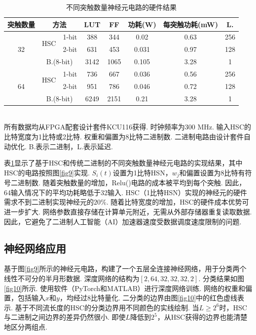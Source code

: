 \documentclass{solitairemiya-art}
\begin{document}
\begin{table}[htbp]
\centering
\caption{不同突触数量神经元电路的硬件结果}
\label{tab1}
\begin{tabular}{cccccccc}
\toprule
突触数量 & \multicolumn{2}{c}{方法} & LUT & FF & 功耗(W) & 每突触功耗(mW) & L. \\
\midrule
\multirow{3}{*}{32} & \multirow{2}{*}{HSC} & 1-bit & 388 & 344 & 0.02 & 0.63 & 256 \\
 & & 2-bit & 631 & 453 & 0.031 & 0.97 & 128 \\
 & \multicolumn{2}{c}{B.(8-bit)} & 3142 & 1065 & 0.105 & 3.28 & 1 \\
\midrule
\multirow{3}{*}{64} & \multirow{2}{*}{HSC} & 1-bit & 736 & 667 & 0.036 & 0.56 & 256 \\
 & & 2-bit & 951 & 786 & 0.046 & 0.72 & 128 \\
 & \multicolumn{2}{c}{B.(8-bit)} & 6249 & 2151 & 0.21 & 3.28 & 1 \\
\bottomrule
\end{tabular}
\\[0.5em]
\small
所有数据均从FPGA配套设计套件KCU116获得. 时钟频率为300 MHz. 输入HSC的比特宽度为1比特或2比特. 权重和偏置为8比特二进制数. 二进制电路由设计套件自动优化. B.表示二进制，L.表示延迟. 
\end{table}

表\ref{tab1}显示了基于HSC和传统二进制的不同突触数量神经元电路的实现结果，其中HSC的电路按照图\ref{fig9}实现. $S_i(t)$设置为1比特HSN，$w_j$和偏置设置为8比特有符号二进制数. 随着突触数量的增加，Relu()电路的成本被平均到每个突触. 因此，64输入情况下的平均功耗略低于32输入. HSC（1比特HSN）实现的神经元的硬件需求不到二进制实现神经元的$20\%$. 随着比特宽度的增加，HSC的硬件成本优势可进一步扩大. 网络参数直接存储在计算单元附近，无需从外部存储器重复读取数据. 因此，它避免了二进制人工智能（AI）加速器速度受数据调度速度限制的问题. 

\subsection{神经网络应用}

基于图\ref{fig9}所示的神经元电路，构建了一个五层全连接神经网络，用于分类两个线性不可分的半月形数据. 深度网络的结构为$[2, 64, 32, 32, 32, 2]$. 分类结果如图\ref{fig10}所示. 使用软件（PyTorch和MATLAB）进行深度网络训练. 网络的权重和偏置，包括输入$x$和$y$，均经过8比特量化. 二分类的边界由图\ref{fig10}中的红色虚线表示. 基于不同流长度的HSC的分类边界用不同颜色的实线绘制. 当$L \geq 2^6$时，HSC与二进制之间边界的差异仍然很小. 即使$L$降低到$2^5$，从HSC获得的边界也能清楚地区分两组点. 
\end{document}
